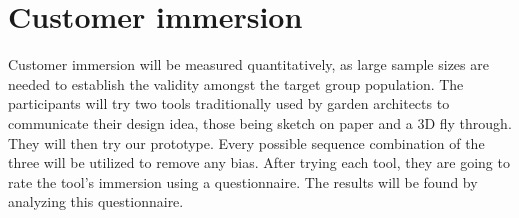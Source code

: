 \section{Customer immersion}
Customer immersion will be measured quantitatively, as large sample sizes are needed to establish the validity amongst the target group population. The participants will try two tools traditionally used by garden architects to communicate their design idea, those being sketch on paper and a 3D fly through. They will then try our prototype. Every possible sequence combination of the three will be utilized to remove any bias. After trying each tool, they are going to rate the tool's immersion using a questionnaire. The results will be found by analyzing this questionnaire.